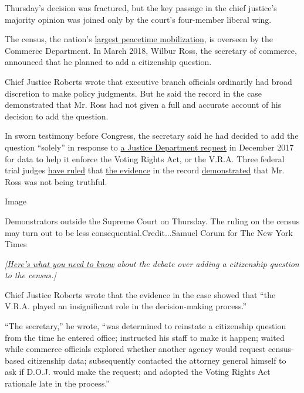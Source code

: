 Thursday's decision was fractured, but the key passage in the chief
justice's majority opinion was joined only by the court's four-member
liberal wing.

The census, the nation's
\href{https://www.oig.doc.gov/OIGPublications/OIG-11-030-I.pdf}{largest
peacetime mobilization}, is overseen by the Commerce Department. In
March 2018, Wilbur Ross, the secretary of commerce, announced that he
planned to add a citizenship question.

Chief Justice Roberts wrote that executive branch officials ordinarily
had broad discretion to make policy judgments. But he said the record in
the case demonstrated that Mr. Ross had not given a full and accurate
account of his decision to add the question.

In sworn testimony before Congress, the secretary said he had decided to
add the question ``solely'' in response to
\href{https://www.documentcloud.org/documents/4340651-Text-of-Dec-2017-DOJ-letter-to-Census.html}{a
Justice Department request} in December 2017 for data to help it enforce
the Voting Rights Act, or the V.R.A. Three federal trial judges
\href{https://www.brennancenter.org/sites/default/files/legal-work/2019-01-15-574-Findings\%20Of\%20Fact.pdf}{have
ruled} that
\href{https://www.brennancenter.org/sites/default/files/legal-work/Order_3\%3A6\%3A19.pdf}{the
evidence} in the record
\href{https://www.brennancenter.org/sites/default/files/legal-work/FindingsofFact_\%202019-04-05.pdf}{demonstrated}
that Mr. Ross was not being truthful.

Image

Demonstrators outside the Supreme Court on Thursday. The ruling on the
census may turn out to be less consequential.Credit...Samuel Corum for
The New York Times

\emph{{[}}\href{https://www.nytimes.com/2019/06/27/us/census-question-citizenship.html?action=click\&module=Intentional\&pgtype=Article}{\emph{Here's
what you need to know}} \emph{about the debate over adding a citizenship
question to the census.{]}}

Chief Justice Roberts wrote that the evidence in the case showed that
``the V.R.A. played an insignificant role in the decision-making
process.''

``The secretary,'' he wrote, ``was determined to reinstate a citizenship
question from the time he entered office; instructed his staff to make
it happen; waited while commerce officials explored whether another
agency would request census-based citizenship data; subsequently
contacted the attorney general himself to ask if D.O.J. would make the
request; and adopted the Voting Rights Act rationale late in the
process.''

